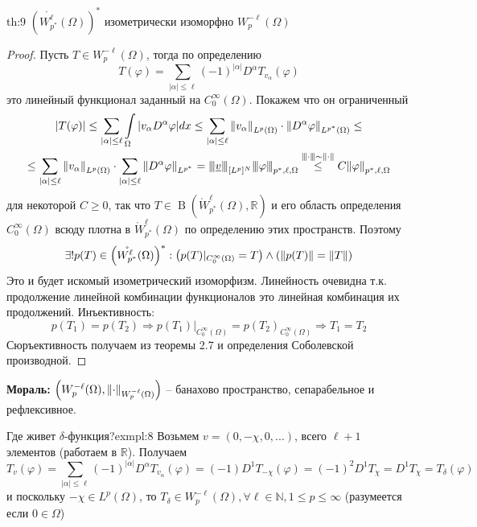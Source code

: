 \documentclass[12pt,a4paper]{article}
\newcommand{\intset}[1]{\int\limits_{#1}}
\newcommand{\Real}{\mathbb{R}}
\newcommand{\Natural}{\mathbb{N}}
\newcommand{\nnorm}[1]{{\left\vert\kern-0.25ex\left\vert\kern-0.25ex\left\vert #1 
		\right\vert\kern-0.25ex\right\vert\kern-0.25ex\right\vert}}
\DeclareMathOperator{\bounded}{B}
\begin{document}
\begin{theorem}{}{th:9}
	$\left(\mathring{W_{p^*}^\ell} (\Omega)\right)^*$ изометрически изоморфно $W_p^{-\ell} (\Omega)$
\end{theorem}
\begin{proof}
	Пусть $T \in W_p^{-\ell} (\Omega)$, тогда по определению
	\begin{equation*}
		T (\varphi) = \sum\limits_{|\alpha| \leq \ell}{(-1)^{|\alpha|} D^\alpha T_{v_\alpha} (\varphi)}
	\end{equation*}
	это линейный функционал заданный на $C_0^\infty (\Omega)$. Покажем что он ограниченный
	\begin{multline*}
		|T(\varphi)| \leq \sum\limits_{|\alpha| \leq \ell}{\intset{\Omega}{|v_\alpha D^\alpha \varphi| dx}} \leq \sum\limits_{|\alpha| \leq \ell}{\norm{v_\alpha}_{L^p (\Omega)} \cdot \norm{D^\alpha \varphi}_{L^{p^*} (\Omega)}} \leq \\ \leq \sum\limits_{|\alpha| \leq \ell}{\norm{v_\alpha}_{L^p (\Omega)}} \cdot \sum\limits_{|\alpha| \leq \ell}{\norm{D^\alpha \varphi}_{L^{p^*}}} = \nnorm{\underline{v}}_{[L^p]^N} \nnorm{\varphi}_{p^*, \ell, \Omega} \overset{\nnorm{\cdot} \sim \norm{\cdot}}{\leq} C \norm{\varphi}_{p^*, \ell, \Omega}
	\end{multline*}
	для некоторой $C \geq 0$, так что $T \in \bounded(\mathring{W}_{p^*}^\ell (\Omega), \Real)$ и его область определения $C_0^\infty(\Omega)$ всюду плотна в $\mathring{W}_{p^*}^\ell (\Omega)$ по определению этих пространств. Поэтому 
	\begin{equation*}
		\exists!{p (T)} \in \left(\mathring{W_{p^*}^\ell} (\Omega)\right)^*: \left( p(T) |_{C_0^\infty (\Omega)} = T \right) \wedge \left( \norm{p (T)} = \norm{T} \right)
	\end{equation*}
	Это и будет искомый изометрический изоморфизм. Линейность очевидна т.к. продолжение линейной комбинации функционалов это линейная комбинация их продолжений. Инъективность:
	\begin{equation*}
		p(T_1) = p(T_2) \Rightarrow p(T_1) |_{C_0^\infty (\Omega)} = p(T_2)_{C_0^\infty (\Omega)} \Rightarrow T_1 = T_2
	\end{equation*} 
	Сюръективность получаем из теоремы 2.7 и определения Соболевской производной. 
\end{proof}
\textbf{Мораль:} $\left( W_p^{-\ell} (\Omega), \norm{\cdot}_{W_p^{-\ell} (\Omega)} \right)$ -- банахово пространство, сепарабельное и рефлексивное. 

\begin{example}{Где живет $\delta$-функция?}{exmpl:8}
	Возьмем $v = (0, -\chi, 0, ...)$, всего $\ell + 1$ элементов (работаем в $\Real$). Получаем 
	\begin{equation*}
		T_v (\varphi) = \sum\limits_{|\alpha| \leq \ell}{(-1)^{|\alpha|} D^\alpha T_{v_\alpha}(\varphi)} = (-1)D^1 T_{-\chi} (\varphi) = (-1)^2 D^1 T_{\chi} = D^1 T_{\chi} = T_\delta (\varphi)
	\end{equation*}
	и поскольку $-\chi \in L^p (\Omega)$, то $T_\delta \in W_p^{-\ell} (\Omega), \forall \ell \in \Natural, 1 \leq p \leq \infty$ (разумеется если $0 \in \Omega$)
\end{example}
\end{document}
